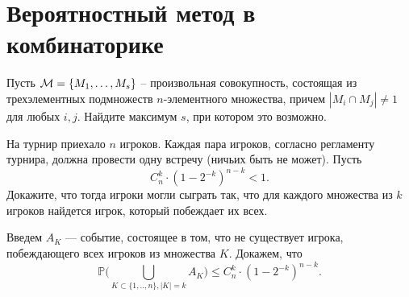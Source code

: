 \section{Вероятностный метод в комбинаторике}

\begin{problem}
 Пусть $ {\cal M} = \{M_1, \dots, M_s\} $ -- 
произвольная совокупность, состоящая из трехэлементных подмножеств 
$ n $-элементного множества, причем $ |M_i \cap M_j| \neq 1 $ для любых 
$ i, j $. Найдите максимум $ s $, при котором это возможно. 
\end{problem}

\begin{problem}
На турнир приехало $n$ игроков. Каждая пара игроков, согласно регламенту турнира, должна провести одну встречу (ничьих быть не может). Пусть 
$$
C_n^k\cdot (1-2^{-k})^{n-k}<1 . 
$$
Докажите, что тогда игроки могли сыграть так, что для каждого множества из $k$ игроков найдется игрок, который побеждает их всех. 

\end{problem}

\begin{ordre}
Введем $A_K$ --- событие, состоящее в том, что не существует игрока, побеждающего всех игроков из множества $K$. 
Докажем, что 
$$
{\mathbb P}\bigl(\bigcup\limits_{K\subset\{1,..,n\},|K|=k} A_K \bigr)\leqslant C_n^k\cdot (1-2^{-k})^{n-k} . 
$$

\end{ordre}


\begin{comment}

\begin{problem}
Рассмотрим матрицу $n\times n$, составленную из лампочек, каждая из которых любо включена $(a_{ij}=1)$, либо выключена $(a_{ij}=-1)$. 
Предположим, что для каждой строки и каждого столбца имеется переключатель, поворот которого ($x_i=-1$ для строки $i$ и 
$y_j=-1$ для столбца $j$) переключает все лампочки в соответствующей линии: с <<вкл.>> на <<выкл.>> и с <<выкл.>> на <<вкл.>>. 
Тогда для любой начальной конфигурации лампочек можно установить такое положение переключателей, что разность между числом включенных и 
выключенных лампочек будет не меньше $(\sqrt{2/\pi}+o(1))n^{3/2}$. 
\end{problem}

\begin{ordre}
Рассмотрите  переключатель по столбцам как случайную величину, принимающую с равной вероятностью значения 1, -1. Каждому переключателю по столбцам необходимо подобрать переключатель по строкам, максимизирующий разность включенных и 
выключенных лампочек. Распределение данной разности можно оценить при помощи ц.п.т.       
\end{ordre}
\end{comment}

